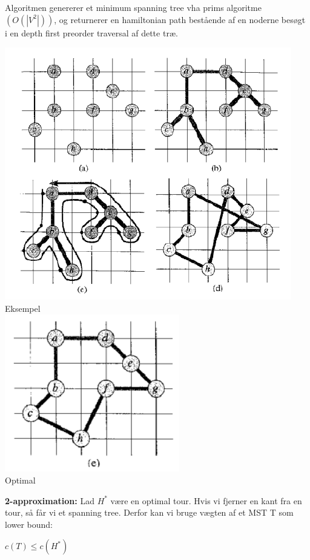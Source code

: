 \documentclass{article}
\begin{document}
Algoritmen genererer et minimum spanning tree vha prims algoritme $(O(|V^2|))$, og returnerer en hamiltonian path bestående af  en noderne besøgt i en depth first preorder traversal af dette træ.\\ 

\begin{center}
	\includegraphics[scale=0.5]{ApproxMetricTSP}\\ Eksempel\\
	\includegraphics[scale=0.5]{tspMetricOptimal}\\ Optimal 
\end{center}
\textbf{2-approximation:} Lad $H^*$ være en optimal tour. Hvis vi fjerner en kant fra en tour, så får vi et spanning tree. Derfor kan vi bruge vægten af et MST T som lower bound:
\begin{center}
 $c(T) \le c(H^*)$
\end{center}
\end{document}
